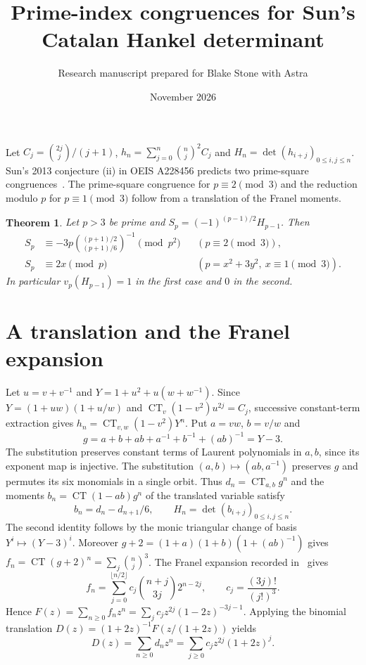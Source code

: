 \documentclass[11pt]{article}
\title{Prime-index congruences for Sun's Catalan Hankel determinant}
\author{Research manuscript prepared for Blake Stone with Astra}\date{November 2026}
\newtheorem{theorem}{Theorem}\newcommand{\CT}{\operatorname{CT}}
\begin{document}
\maketitle
Let $C_j=\binom{2j}{j}/(j+1)$, $h_n=\sum_{j=0}^n\binom nj^2 C_j$ and $H_n=\det(h_{i+j})_{0\le i,j\le n}$. Sun's 2013 conjecture (ii) in OEIS A228456 predicts two prime-square congruences~\cite{oeis}. The prime-square congruence for $p\equiv2\pmod3$ and the reduction modulo $p$ for $p\equiv1\pmod3$ follow from a translation of the Franel moments.
\begin{theorem}
Let $p>3$ be prime and $S_p=(-1)^{(p-1)/2}H_{p-1}$. Then
\[
\begin{aligned}
S_p&\equiv -3p\binom{(p+1)/2}{(p+1)/6}^{-1}\pmod{p^2}
   &&(p\equiv2\!\pmod3),\\
S_p&\equiv 2x\pmod p
   &&(p=x^2+3y^2,\ x\equiv1\!\pmod3).
\end{aligned}
\]
In particular $v_p(H_{p-1})=1$ in the first case and $0$ in the second.
\end{theorem}

\section{A translation and the Franel expansion}
Let $u=v+v^{-1}$ and $Y=1+u^2+u(w+w^{-1})$. Since
$Y=(1+uw)(1+u/w)$ and $\CT_v(1-v^2)u^{2j}=C_j$, successive constant-term extraction gives
$h_n=\CT_{v,w}(1-v^2)Y^n$. Put $a=vw$, $b=v/w$ and
\[
 g=a+b+ab+a^{-1}+b^{-1}+(ab)^{-1}=Y-3.
\]
The substitution preserves constant terms of Laurent polynomials in $a,b$, since its exponent map is injective. The substitution $(a,b)\mapsto(ab,a^{-1})$ preserves $g$ and permutes its six monomials in a single orbit. Thus $d_n=\CT_{a,b}g^n$ and the moments $b_n=\CT(1-ab)g^n$ of the translated variable satisfy
\[
 b_n=d_n-d_{n+1}/6,\qquad H_n=\det(b_{i+j})_{0\le i,j\le n}.
\]
The second identity follows by the monic triangular change of basis $Y^i\mapsto(Y-3)^i$.
Moreover $g+2=(1+a)(1+b)(1+(ab)^{-1})$ gives $f_n=\CT(g+2)^n=\sum_j\binom nj^3$.
The Franel expansion recorded in~\cite[eq.~(2.4)]{mao} gives
\[
 f_n=\sum_{j=0}^{\lfloor n/2\rfloor} c_j\binom{n+j}{3j}2^{n-2j},
 \qquad c_j=\frac{(3j)!}{(j!)^3}.
\]
Hence $F(z)=\sum_{n\ge0}f_nz^n=\sum_j c_jz^{2j}(1-2z)^{-3j-1}$. Applying the binomial translation $D(z)=(1+2z)^{-1}F(z/(1+2z))$ yields
\begin{equation}
 D(z)=\sum_{n\ge0}d_nz^n=\sum_{j\ge0}c_j z^{2j}(1+2z)^j .
 \tag{1}
\end{equation}
\end{document}
